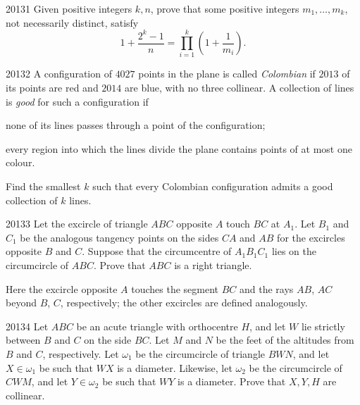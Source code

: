 
\begin{problem}{2013}{1}
Given positive integers $k, n$, prove that some positive integers $m_1, \dots, m_k$, not necessarily distinct, satisfy
\[
    1+\frac{2^k-1}{n}=\prod_{i=1}^k\left(1+\frac1{m_i}\right).
\]
\end{problem}

\begin{problem}{2013}{2}
A configuration of $4027$ points in the plane is called \emph{Colombian} if $2013$ of its points are red and $2014$ are blue, with no three collinear. A collection of lines is \emph{good} for such a configuration if
\begin{problemclauses}
    \item none of its lines passes through a point of the configuration;
    \item every region into which the lines divide the plane contains points of at most one colour.
\end{problemclauses}
Find the smallest $k$ such that every Colombian configuration admits a good collection of $k$ lines.
\end{problem}

\begin{problem}{2013}{3}
Let the excircle of triangle $ABC$ opposite $A$ touch $BC$ at $A_1$. Let $B_1$ and $C_1$ be the analogous tangency points on the sides $CA$ and $AB$ for the excircles opposite $B$ and $C$. Suppose that the circumcentre of $A_1B_1C_1$ lies on the circumcircle of $ABC$. Prove that $ABC$ is a right triangle.

Here the excircle opposite $A$ touches the segment $BC$ and the rays $AB$, $AC$ beyond $B$, $C$, respectively; the other excircles are defined analogously.
\end{problem}

\begin{problem}{2013}{4}
Let $ABC$ be an acute triangle with orthocentre $H$, and let $W$ lie strictly between $B$ and $C$ on the side $BC$. Let $M$ and $N$ be the feet of the altitudes from $B$ and $C$, respectively. Let $\omega_1$ be the circumcircle of triangle $BWN$, and let $X\in\omega_1$ be such that $WX$ is a diameter. Likewise, let $\omega_2$ be the circumcircle of $CWM$, and let $Y\in\omega_2$ be such that $WY$ is a diameter. Prove that $X, Y, H$ are collinear.
\end{problem}

